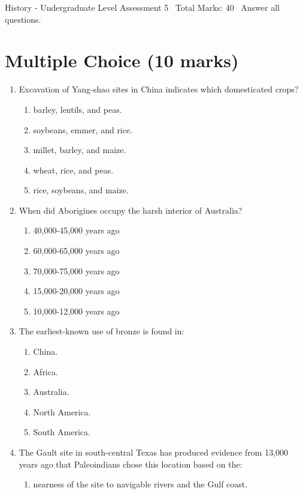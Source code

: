 \documentclass[12pt]{article}
\begin{document}
\begin{center}
History - Undergraduate Level Assessment 5 \
Total Marks: 40 \
Answer all questions.
\end{center}

\section*{Multiple Choice (10 marks)}
\begin{enumerate}[label=\arabic*.]
\item Excavation of Yang-shao sites in China indicates which domesticated crops?
\begin{enumerate}[label=(\alph*)]
    \item barley, lentils, and peas.
    \item soybeans, emmer, and rice.
    \item millet, barley, and maize.
    \item wheat, rice, and peas.
    \item rice, soybeans, and maize.
\end{enumerate}
\item When did Aborigines occupy the harsh interior of Australia?
\begin{enumerate}[label=(\alph*)]
    \item 40,000-45,000 years ago
    \item 60,000-65,000 years ago
    \item 70,000-75,000 years ago
    \item 15,000-20,000 years ago
    \item 10,000-12,000 years ago
\end{enumerate}
\item The earliest-known use of bronze is found in:
\begin{enumerate}[label=(\alph*)]
    \item China.
    \item Africa.
    \item Australia.
    \item North America.
    \item South America.
\end{enumerate}
\item The Gault site in south-central Texas has produced evidence from 13,000 years ago that
Paleoindians chose this location based on the:
\begin{enumerate}[label=(\alph*)]
    \item nearness of the site to navigable rivers and the Gulf coast.

\end{enumerate}
\end{enumerate}
\end{document}
